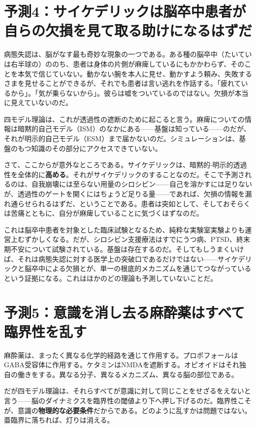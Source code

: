 \documentclass[11pt, twoside, openright]{book}
\begin{document}
\section*{予測4：サイケデリックは脳卒中患者が自らの欠損を見て取る助けになるはずだ}

病態失認は、脳がなす最も奇妙な現象の一つである。ある種の脳卒中（たいていは右半球の）ののち、患者は身体の片側が麻痺しているにもかかわらず、そのことを本気で信じていない。動かない腕を本人に見せ、動かすよう頼み、失敗するさまを見せることができるが、それでも患者は言い逃れを作話する。「疲れているから」。「気が乗らないから」。彼らは嘘をついているのではない。欠損が本当に見えていないのだ。

四モデル理論は、これが透過性の遮断のために起こると言う。麻痺についての情報は暗黙的自己モデル（ISM）のなかにある------基盤は知っている------のだが、それが明示的自己モデル（ESM）まで届かないのだ。シミュレーションは、基盤のもつ知識のその部分にアクセスできていない。

さて、ここからが意外なところである。サイケデリックは、暗黙的-明示的透過性を全体的に\textbf{高める}。それがサイケデリックのすることなのだ。そこで予測されるのは、自我崩壊には至らない用量のシロシビン------自己を溶かすには足りないが、透過性のゲートを開くにはちょうど足りる量------であれば、欠損の情報を漏れ通らせられるはずだ、ということである。患者は突如として、そしておそらくは苦痛とともに、自分が麻痺していることに気づくはずなのだ。

これは脳卒中患者を対象とした臨床試験となるため、純粋な実験室実験よりも運営上むずかしくなる。だが、シロシビン支援療法はすでにうつ病、PTSD、終末期不安について試験されている。基盤は存在するのだ。そしてもしうまくいけば、それは病態失認に対する医学上の突破口であるだけではない------サイケデリックと脳卒中による欠損とが、単一の根底的メカニズムを通じてつながっているという証拠になる。これはほかのどの理論も予測していないことだ。

\section*{予測5：意識を消し去る麻酔薬はすべて臨界性を乱す}

麻酔薬は、まったく異なる化学的経路を通じて作用する。プロポフォールはGABA受容体に作用する。ケタミンはNMDAを遮断する。オピオイドはそれ独自の働きをする。異なる分子、異なるメカニズム、異なる脳の部位である。

だが四モデル理論は、それらすべてが意識に対して同じことをせざるをえないと言う------脳のダイナミクスを臨界性の閾値より下へ押し下げるのだ。臨界性こそが、意識の\textbf{物理的な必要条件}だからである。どのように乱すかは問題ではない。亜臨界に落ちれば、灯りは消える。
\end{document}

